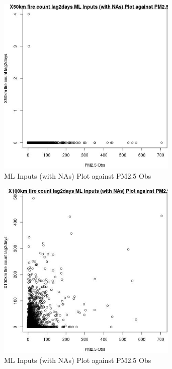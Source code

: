 \begin{figure} 
\centering  
\includegraphics[width=0.77\textwidth]{Code_Outputs/Report_ML_input_PM25_Step4_part_e_de_duplicated_aves_compiled_2019-05-14wNAs_X50km_fire_count_lag2daysvPM25_Obs.jpg} 
\caption{\label{fig:Report_ML_input_PM25_Step4_part_e_de_duplicated_aves_compiled_2019-05-14wNAsX50km_fire_count_lag2daysvPM25_Obs}ML Inputs (with NAs) Plot against PM2.5 Obs} 
\end{figure} 
 

\begin{figure} 
\centering  
\includegraphics[width=0.77\textwidth]{Code_Outputs/Report_ML_input_PM25_Step4_part_e_de_duplicated_aves_compiled_2019-05-14wNAs_X100km_fire_count_lag2daysvPM25_Obs.jpg} 
\caption{\label{fig:Report_ML_input_PM25_Step4_part_e_de_duplicated_aves_compiled_2019-05-14wNAsX100km_fire_count_lag2daysvPM25_Obs}ML Inputs (with NAs) Plot against PM2.5 Obs} 
\end{figure} 
 

